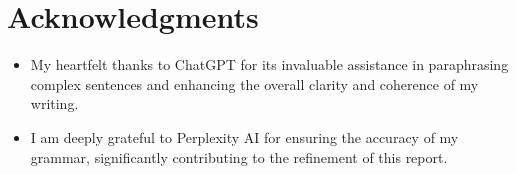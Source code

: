 \documentclass[12pt]{article}
\begin{document}
\section*{Acknowledgments}

\begin{itemize}
    \item My heartfelt thanks to ChatGPT for its invaluable assistance in paraphrasing complex sentences and enhancing the overall clarity and coherence of my writing.
    \item I am deeply grateful to Perplexity AI for ensuring the accuracy of my grammar, significantly contributing to the refinement of this report.
\end{itemize}
\end{document}
